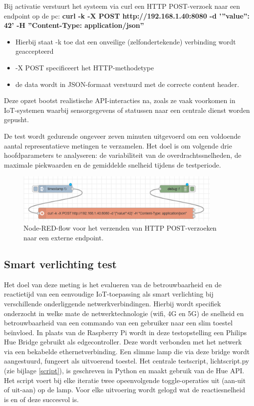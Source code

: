 Bij activatie verstuurt het systeem via curl een HTTP POST-verzoek naar een endpoint op de pc: \textbf{curl -k -X POST http://192.168.1.40:8080 -d ’”value”: 42’ -H ”Content-Type: application/json”}


\begin{itemize}
    \item Hierbij staat -k toe dat een onveilige (zelfondertekende) verbinding wordt geaccepteerd
    \item -X POST specificeert het HTTP-methodetype
    \item de data wordt in JSON-formaat verstuurd met de correcte content header.
\end{itemize}

Deze opzet bootst realistische API-interacties na, zoals ze vaak voorkomen in IoT-systemen waarbij sensorgegevens of statussen naar een centrale dienst worden gepusht.

De test wordt gedurende ongeveer zeven minuten uitgevoerd om een voldoende aantal representatieve metingen te verzamelen. Het doel is om volgende drie hoofdparameters te analyseren: de variabiliteit van de overdrachtssnelheden, de maximale piekwaarden en de gemiddelde snelheid tijdens de testperiode. 


\begin{figure}[h]
    \centering
    \includegraphics[width=0.9\textwidth]{../graphics/node-red_flow.png}
    \caption{Node-RED-flow voor het verzenden van HTTP POST-verzoeken naar een externe endpoint.}
    \label{fig:nodered-flow}
\end{figure}

\subsection{Smart verlichting test}
Het doel van deze meting is het evalueren van de betrouwbaarheid en de reactietijd van een eenvoudige IoT-toepassing als smart verlichting bij verschillende onderliggende netwerkverbindingen.
Hierbij wordt specifiek onderzocht in welke mate de netwerktechnologie (wifi, 4G en 5G) de snelheid en betrouwbaarheid van een commando van een gebruiker naar een slim toestel beïnvloed.
In plaats van de Raspberry Pi wordt in deze testopstelling een Philips Hue Bridge gebruikt als edgecontroller. Deze wordt verbonden met het netwerk via een bekabelde ethernetverbinding. Een slimme lamp die via deze bridge wordt aangestuurd, fungeert als uitvoerend toestel.
Het centrale testscript, lichtscript.py (zie bijlage \ref{script}), is geschreven in Python en maakt gebruik van de Hue API. Het script voert bij elke iteratie twee opeenvolgende toggle-operaties uit (aan-uit of uit-aan) op de lamp. Voor elke uitvoering wordt gelogd wat de reactiesnelheid is en of deze succesvol is.

